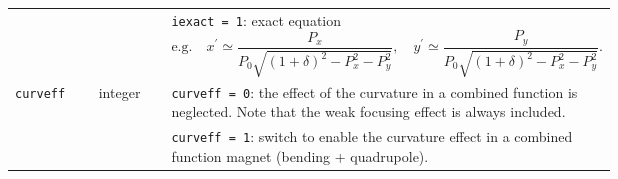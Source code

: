 \begin{longtabu}{@{}llp{0.7\linewidth}}
                           &          & \texttt{iexact = 1}: exact equation
                           \begin{equation*}
                                \mbox{e.g.}
                                \quad x^\prime \simeq \frac{P_x}{P_0\sqrt{(1+\delta)^2-P_x^2-P_y^2}},
                                \quad y^\prime \simeq \frac{P_y}{P_0\sqrt{(1+\delta)^2-P_x^2-P_y^2}}.
                           \end{equation*} \\
    \texttt{curveff}       & integer  & \texttt{curveff = 0}: the effect of the curvature in a combined function is neglected. Note that the weak focusing effect is always included. \\
                           &          & \texttt{curveff = 1}: switch to enable the curvature effect in a combined function magnet (bending + quadrupole).
\end{longtabu}


